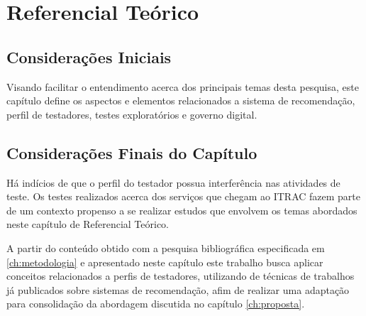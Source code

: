 \chapter{Referencial Teórico}
\label{ch:referencial}

\section{Considerações Iniciais}
Visando facilitar o entendimento acerca dos principais temas desta pesquisa, este capítulo define os aspectos e elementos relacionados a sistema de
recomendação, perfil de testadores, testes exploratórios e governo digital.







\section{Considerações Finais do Capítulo}

Há indícios de que o perfil do testador possua interferência nas atividades de teste. Os testes realizados acerca dos serviços que chegam ao ITRAC fazem parte de um contexto propenso a se realizar estudos que envolvem os temas abordados neste capítulo de Referencial Teórico.

A partir do conteúdo obtido com a pesquisa bibliográfica especificada em \ref{ch:metodologia} e apresentado neste capítulo este trabalho busca aplicar conceitos relacionados a perfis de testadores, utilizando de técnicas de trabalhos já publicados sobre sistemas de recomendação, afim de realizar uma adaptação para consolidação da abordagem discutida no capítulo \ref{ch:proposta}. 

